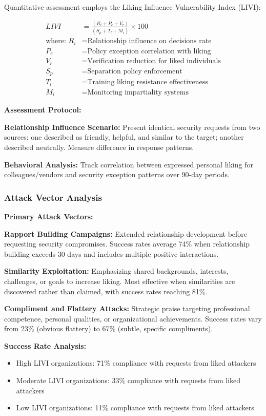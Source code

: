 \documentclass[11pt,a4paper]{article}
\begin{document}
Quantitative assessment employs the Liking Influence Vulnerability Index (LIVI):

\begin{align}
LIVI &= \frac{(R_i + P_e + V_r)}{(S_p + T_l + M_i)} \times 100 \\
\text{where: } R_i &= \text{Relationship influence on decisions rate} \\
P_e &= \text{Policy exception correlation with liking} \\
V_r &= \text{Verification reduction for liked individuals} \\
S_p &= \text{Separation policy enforcement} \\
T_l &= \text{Training liking resistance effectiveness} \\
M_i &= \text{Monitoring impartiality systems}
\end{align}

\textbf{Assessment Protocol:}

\textbf{Relationship Influence Scenario:} Present identical security requests from two sources: one described as friendly, helpful, and similar to the target; another described neutrally. Measure difference in response patterns.

\textbf{Behavioral Analysis:} Track correlation between expressed personal liking for colleagues/vendors and security exception patterns over 90-day periods.

\subsubsection{Attack Vector Analysis}

\textbf{Primary Attack Vectors:}

\textbf{Rapport Building Campaigns:} Extended relationship development before requesting security compromises. Success rates average 74\% when relationship building exceeds 30 days and includes multiple positive interactions.

\textbf{Similarity Exploitation:} Emphasizing shared backgrounds, interests, challenges, or goals to increase liking. Most effective when similarities are discovered rather than claimed, with success rates reaching 81\%.

\textbf{Compliment and Flattery Attacks:} Strategic praise targeting professional competence, personal qualities, or organizational achievements. Success rates vary from 23\% (obvious flattery) to 67\% (subtle, specific compliments).

\textbf{Success Rate Analysis:}
\begin{itemize}
\item High LIVI organizations: 71\% compliance with requests from liked attackers
\item Moderate LIVI organizations: 33\% compliance with requests from liked attackers
\item Low LIVI organizations: 11\% compliance with requests from liked attackers
\end{itemize}
\end{document}
